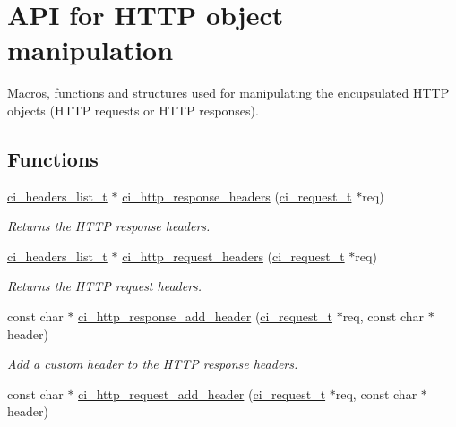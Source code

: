 \hypertarget{group__HTTP}{
\section{API for HTTP object manipulation}
\label{group__HTTP}
}


Macros, functions and structures used for manipulating the encupsulated HTTP objects (HTTP requests or HTTP responses).  
\subsection*{Functions}
\begin{DoxyCompactItemize}
\item 
\hyperlink{group__HEADERS_gaaa203ac92dd0242ab66f4237548d7260}{ci\_\-headers\_\-list\_\-t} $\ast$ \hyperlink{group__HTTP_ga4572d0ede7cad4215c9fc2cb3a629b56}{ci\_\-http\_\-response\_\-headers} (\hyperlink{group__REQUEST_ga27da5c4ae491f527ce36901c2e78ea04}{ci\_\-request\_\-t} $\ast$req)
\begin{DoxyCompactList}\small\item\em Returns the HTTP response headers. \item\end{DoxyCompactList}\item 
\hyperlink{group__HEADERS_gaaa203ac92dd0242ab66f4237548d7260}{ci\_\-headers\_\-list\_\-t} $\ast$ \hyperlink{group__HTTP_ga540aa605e981d0b57f940bea6e37c40b}{ci\_\-http\_\-request\_\-headers} (\hyperlink{group__REQUEST_ga27da5c4ae491f527ce36901c2e78ea04}{ci\_\-request\_\-t} $\ast$req)
\begin{DoxyCompactList}\small\item\em Returns the HTTP request headers. \item\end{DoxyCompactList}\item 
const char $\ast$ \hyperlink{group__HTTP_ga9e70a82a932d48d33da3e9e8487c0d6b}{ci\_\-http\_\-response\_\-add\_\-header} (\hyperlink{group__REQUEST_ga27da5c4ae491f527ce36901c2e78ea04}{ci\_\-request\_\-t} $\ast$req, const char $\ast$header)
\begin{DoxyCompactList}\small\item\em Add a custom header to the HTTP response headers. \item\end{DoxyCompactList}\item 
const char $\ast$ \hyperlink{group__HTTP_ga2771dada488942b12bcc60ae1ea35574}{ci\_\-http\_\-request\_\-add\_\-header} (\hyperlink{group__REQUEST_ga27da5c4ae491f527ce36901c2e78ea04}{ci\_\-request\_\-t} $\ast$req, const char $\ast$header)

\end{DoxyCompactItemize}
